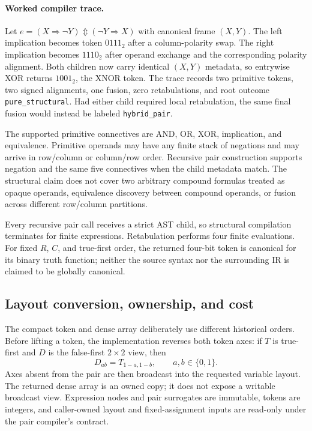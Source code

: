 \documentclass[11pt]{article}
\newcommand{\XOR}{\mathbin{\Updownarrow}}
\begin{document}
\paragraph{Worked compiler trace.}
Let
$e=(X\Rightarrow\neg Y)\XOR(\neg Y\Rightarrow X)$ with canonical frame
$(X,Y)$. The left implication becomes token $0111_2$ after a column-polarity
swap. The right implication becomes $1110_2$ after operand exchange and the
corresponding polarity alignment. Both children now carry identical $(X,Y)$
metadata, so entrywise XOR returns $1001_2$, the XNOR token. The trace records
two primitive tokens, two signed alignments, one fusion, zero retabulations,
and root outcome \texttt{pure\_structural}. Had either child required local
retabulation, the same final fusion would instead be labeled
\texttt{hybrid\_pair}.

The supported primitive connectives are AND, OR, XOR, implication, and
equivalence. Primitive operands may have any finite stack of negations and may
arrive in row/column or column/row order. Recursive pair construction supports
negation and the same five connectives when the child metadata match. The
structural claim does not cover two arbitrary compound formulas treated as
opaque operands, equivalence discovery between compound operands, or fusion
across different row/column partitions.

Every recursive pair call receives a strict AST child, so structural
compilation terminates for finite expressions. Retabulation performs four
finite evaluations. For fixed $R$, $C$, and true-first order, the returned
four-bit token is canonical for its binary truth function; neither the source
syntax nor the surrounding IR is claimed to be globally canonical.

\subsection{Layout conversion, ownership, and cost}

The compact token and dense array deliberately use different historical
orders. Before lifting a token, the implementation reverses both token axes:
if $T$ is true-first and $D$ is the false-first $2\times2$ view, then
\begin{equation}
  D_{ab}=T_{1-a,1-b},
  \qquad a,b\in\{0,1\}.
  \label{eq:layout-conversion}
\end{equation}
Axes absent from the pair are then broadcast into the requested variable
layout. The returned dense array is an owned copy; it does not expose a
writable broadcast view. Expression nodes and pair surrogates are immutable,
tokens are integers, and caller-owned layout and fixed-assignment inputs are
read-only under the pair compiler's contract.
\end{document}
